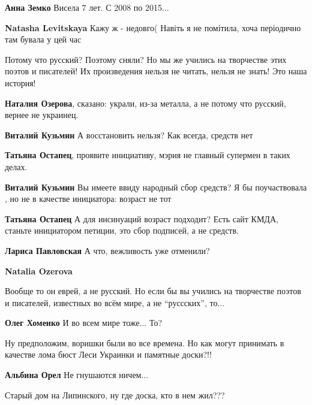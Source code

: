 \begin{itemize}
\begin{itemize} %
\textbf{Анна Земко}
Висела 7 лет. С 2008 по 2015...

\textbf{Natasha Levitskaya} Кажу ж - недовго( Навіть я не помітила, хоча періодично там бувала у цей час
\end{itemize} %


Потому что русский? Поэтому сняли? Но мы же учились на творчестве этих поэтов
и писателей! Их произведения нельзя не читать, нельзя не знать! Это наша
история!

\begin{itemize} %
\textbf{Наталия Озерова}, сказано: украли, из-за металла, а не потому что русский, вернее не украинец.

\textbf{Виталий Кузьмин} А восстановить нельзя? Как всегда, средств нет

\textbf{Татьяна Остапец}, проявите инициативу, мэрия не главный супермен в таких делах.

\textbf{Виталий Кузьмин} Вы имеете ввиду народный сбор средств? Я бы поучаствовала , но не в качестве инициатора: возраст не тот

\textbf{Татьяна Остапец} А для инсинуаций возраст подходит? Есть сайт КМДА, станьте инициатором петиции, это сбор подписей, а не средств.

\textbf{Лариса Павловская} А что, вежливость уже отменили?

\textbf{Natalia Ozerova} 

Вообще то он еврей, а не русский. Но если бы вы учились на творчестве поэтов и
писателей, известных во всём мире, а не \enquote{руссских}, то...

\textbf{Олег Хоменко} И во всем мире тоже... То?
\end{itemize} %


Ну предположим, воришки были во все времена. Но как могут принимать в качестве
лома бюст Леси Украинки и памятные доски?!!

\textbf{Альбина Орел}
Не гнушаются ничем...

Старый дом на Липинского, ну где доска, кто в нем жил???

\end{itemize} %
